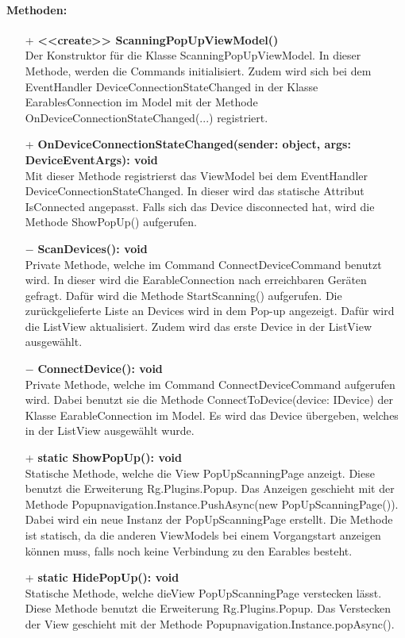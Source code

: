 \documentclass[a4paper,12pt]{article}
\begin{document}
	\paragraph{Methoden:}
	\begin{itemize}
		\item[+] \textbf{<<create>> ScanningPopUpViewModel()}\\Der Konstruktor für die Klasse ScanningPopUpViewModel. In dieser Methode, werden die Commands initialisiert. Zudem wird sich bei dem EventHandler DeviceConnectionStateChanged in der Klasse EarablesConnection im Model mit der Methode OnDeviceConnectionStateChanged(...) registriert.
		\item[+] \textbf{OnDeviceConnectionStateChanged(sender: object, args: DeviceEventArgs): void}\\Mit dieser Methode registrierst das ViewModel bei dem EventHandler DeviceConnectionStateChanged. In dieser wird das statische Attribut IsConnected angepasst. Falls sich das Device disconnected hat, wird die Methode ShowPopUp() aufgerufen.
		\item[$-$] \textbf{ScanDevices(): void}\\Private Methode, welche im Command ConnectDeviceCommand benutzt wird. In dieser wird die EarableConnection nach erreichbaren Geräten gefragt. Dafür wird die Methode StartScanning() aufgerufen. Die zurückgelieferte Liste an Devices wird in dem Pop-up angezeigt. Dafür wird die ListView aktualisiert. Zudem wird das erste Device in der ListView ausgewählt.
		\item[$-$] \textbf{ConnectDevice(): void}\\Private Methode, welche im Command ConnectDeviceCommand aufgerufen wird. Dabei benutzt sie die Methode ConnectToDevice(device: IDevice) der Klasse EarableConnection im Model. Es wird das Device übergeben, welches in der ListView ausgewählt wurde.
		\item[+] \textbf{static ShowPopUp(): void}\\Statische Methode, welche die View PopUpScanningPage anzeigt. Diese benutzt die Erweiterung \Gls{Rg.Plugins.Popup}. Das Anzeigen geschieht mit der Methode Popupnavigation.Instance.PushAsync(new PopUpScanningPage()). Dabei wird ein neue Instanz der PopUpScanningPage erstellt. Die Methode ist statisch, da die anderen ViewModels bei einem Vorgangstart anzeigen können muss, falls noch keine Verbindung zu den \gls{Earables} besteht.
		\item[+] \textbf{static HidePopUp(): void}\\Statische Methode, welche dieView PopUpScanningPage verstecken lässt. Diese Methode benutzt die Erweiterung \Gls{Rg.Plugins.Popup}. Das Verstecken der View geschieht mit der Methode Popupnavigation.Instance.popAsync(). 
	\end{itemize}
\end{document}

